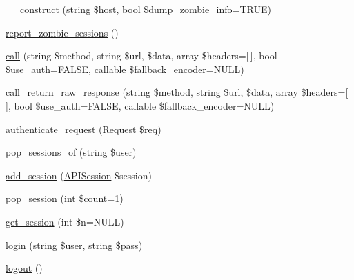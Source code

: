 \begin{DoxyCompactItemize}
\item 
\hyperlink{classlibresignage_1_1tests_1_1common_1_1classes_1_1APIInterface_abed318dd391fefec1148901f0dd696f9}{\+\_\+\+\_\+construct} (string \$host, bool \$dump\+\_\+zombie\+\_\+info=T\+R\+UE)
\item 
\hyperlink{classlibresignage_1_1tests_1_1common_1_1classes_1_1APIInterface_a6b7ea59abeb97427bff353ee40845523}{report\+\_\+zombie\+\_\+sessions} ()
\item 
\hyperlink{classlibresignage_1_1tests_1_1common_1_1classes_1_1APIInterface_a4922d43f3978e809ea26fae489e88277}{call} (string \$method, string \$url, \$data, array \$headers=\mbox{[}$\,$\mbox{]}, bool \$use\+\_\+auth=F\+A\+L\+SE, callable \$fallback\+\_\+encoder=N\+U\+LL)
\item 
\hyperlink{classlibresignage_1_1tests_1_1common_1_1classes_1_1APIInterface_ad2962eb1c1c57d2b7c4e76ef376dc595}{call\+\_\+return\+\_\+raw\+\_\+response} (string \$method, string \$url, \$data, array \$headers=\mbox{[}$\,$\mbox{]}, bool \$use\+\_\+auth=F\+A\+L\+SE, callable \$fallback\+\_\+encoder=N\+U\+LL)
\item 
\hyperlink{classlibresignage_1_1tests_1_1common_1_1classes_1_1APIInterface_aaee5adad4f40c475eaa472b624dd1c25}{authenticate\+\_\+request} (Request \$req)
\item 
\hyperlink{classlibresignage_1_1tests_1_1common_1_1classes_1_1APIInterface_a0049321b0683529a56c098e368026376}{pop\+\_\+sessions\+\_\+of} (string \$user)
\item 
\hyperlink{classlibresignage_1_1tests_1_1common_1_1classes_1_1APIInterface_aa7fa5c284db7062b8f8fcc016f92b302}{add\+\_\+session} (\hyperlink{classlibresignage_1_1tests_1_1common_1_1classes_1_1APISession}{A\+P\+I\+Session} \$session)
\item 
\hyperlink{classlibresignage_1_1tests_1_1common_1_1classes_1_1APIInterface_a30d3c3b05f1f1874a6051938a8630fa4}{pop\+\_\+session} (int \$count=1)
\item 
\hyperlink{classlibresignage_1_1tests_1_1common_1_1classes_1_1APIInterface_a8ab272b9afcb2f6835ef082464e61ec7}{get\+\_\+session} (int \$n=N\+U\+LL)
\item 
\hyperlink{classlibresignage_1_1tests_1_1common_1_1classes_1_1APIInterface_a4208eec9f6b0baf114732a4b0790de38}{login} (string \$user, string \$pass)
\item 
\hyperlink{classlibresignage_1_1tests_1_1common_1_1classes_1_1APIInterface_acf56932b37c278f1f82c4e754926478c}{logout} ()
\end{DoxyCompactItemize}
